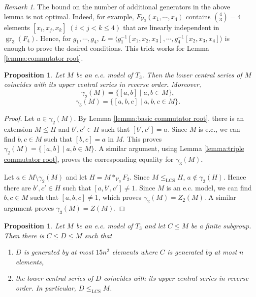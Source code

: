 \documentclass[11pt,reqno]{article}
\newtheorem{proposition}[theorem]{Proposition}
\theoremstyle{definition}
\theoremstyle{remark}
\newtheorem{remark}[theorem]{Remark}
\DeclareMathOperator{\gr}{gr}
\newcommand{\LCS}{\mathrm{LCS}}
\begin{document}
\begin{remark}
    The bound on the number of additional generators in the above lemma is not optimal.
    Indeed, for example, $F_{\mathcal V_3}(x_1,\cdots, x_4)$ contains $\binom 43=4$ elements $[x_i,x_j,x_k]$ $(i<j<k\leq 4)$ that are linearly independent in $\gr_3(F_{4})$.
    Hence, for $g_1,\cdots, g_4$, $L=\langle g_1^{-1}[x_1,x_2,x_3],\cdots, g_4^{-1}[x_2,x_3,x_4]\rangle$ is enough to prove the desired conditions.
    This trick works for Lemma \ref{lemma:commutator root}. 
\end{remark}


\begin{proposition}\label{proposition:structure of e.c. model}
    Let $M$ be an e.c. model of $T_3$. Then the lower central series of $M$
    coincides with its upper central series in reverse order.
    Moreover,
    \[
        \gamma_2(M)=\{[a,b]\mid a,b\in M\},
    \]
    \[
        \gamma_3(M)=\{[a,b,c]\mid a,b,c\in M\}.
    \]
\end{proposition}

\begin{proof}
    Let $a\in \gamma_2(M)$. By Lemma \ref{lemma:basic commutator root}, there is an extension $M\leq H$ and $b',c'\in H$ such that $[b',c']=a$.
    Since $M$ is e.c., we can find $b,c\in M$ such that $[b,c]=a$ in $M$.
    This proves $\gamma_2(M)=\{[a,b]\mid a,b\in M\}$.
    A similar argument, using Lemma \ref{lemma:triple commutator root}, proves the corresponding equality for $\gamma_3(M)$.
    
    Let $a\in M\setminus\gamma_2(M)$ and let $H=M*_{\mathcal V_3}F_2$.
    Since $M\leq_\LCS H$, $a\not\in \gamma_2(H)$.
    Hence there are $b',c'\in H$ such that $[a,b',c']\neq 1$. 
    Since $M$ is an e.c. model, we can find $b,c\in M$ such that $[a,b,c]\neq 1$, which proves $\gamma_2(M)=Z_2(M)$.
    A similar argument proves $\gamma_3(M)=Z(M)$.
\end{proof}



\begin{proposition}\label{proposition:bdd LCS}
    Let $M$ be an e.c. model of $T_3$ and let $C\leq M$ be a finite
    subgroup.
    Then there is $C\leq D\leq M$ such that 
    \begin{enumerate}
        \item $D$ is generated by at most $15n^2$ elements where $C$ is generated by at most $n$ elements,
        \item the lower central series of $D$ coincides with its upper central series in reverse order. In particular, $D\leq_\LCS M$. 
    \end{enumerate}
\end{proposition}
\end{document}
